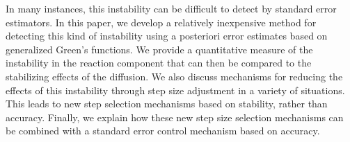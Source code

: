 \documentclass{report}
\begin{document}
In many instances, this instability can be difficult to detect by
standard error estimators. In this paper, we develop a relatively
inexpensive method for detecting this kind of instability using a
posteriori error estimates based on generalized Green's functions. We
provide a quantitative measure of the instability in the reaction
component that can then be compared to the stabilizing effects of the
diffusion. We also discuss mechanisms for reducing the effects of this
instability through step size adjustment in a variety of situations. This
leads to new step selection mechanisms
based on stability, rather than accuracy. Finally, we explain how these
new step size selection mechanisms can be combined with a standard error
control mechanism based on accuracy.
\end{document}
